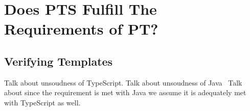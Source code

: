 \chapter{Does PTS Fulfill The Requirements of PT?}\label{ch:does-pts-fulfill-the-requirements-of-pt?}



\section{Verifying Templates}\label{sec:pt-requirements-verifying-templates}

Talk about unsoudness of TypeScript.
Talk about unsoudness of Java~\cite{java-unsound}
Talk about since the requirement is met with Java we assume it is adequately met with TypeScript as well.

